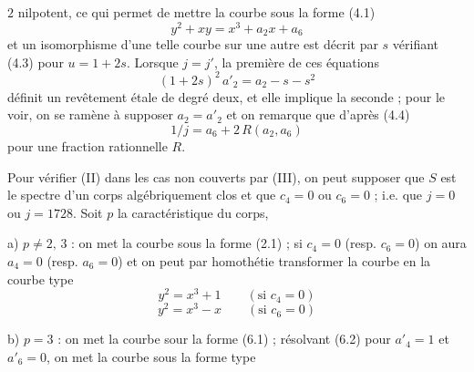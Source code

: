 \makeatletter\tagsleft@true\makeatother

$2$ nilpotent, ce qui permet de mettre la courbe sous la forme (4.1)
\[
y^2+xy=x^3+a_2x+a_6
\]
et un isomorphisme d'une telle courbe sur une autre est décrit par $s$ vérifiant (4.3) pour $u=1+2s$. Lorsque $j=j'$, la première de ces équations
\[
(1+2s)^2\,a'_2=a_2-s-s^2
\]
définit un revêtement étale de degré deux, et elle implique la seconde ; pour le voir, on se ramène à supposer $a_2=a'_2$ et on remarque que d'après (4.4)
\[
1/j=a_6+2\,R(a_2,a_6)
\]
pour une fraction rationnelle $R$.

Pour vérifier (II) dans les cas non couverts par (III), on peut supposer que $S$ est le spectre d'un corps algébriquement clos et que $c_4=0$ ou $c_6=0$ ; i.e. que $j=0$ ou $j=1728$. Soit $p$ la caractéristique du corps,

a) $p\ne 2,\,3$ : on met la courbe sous la forme (2.1) ; si $c_4=0$ (resp. $c_6=0$) on aura $a_4=0$ (resp. $a_6=0$) et on peut par homothétie transformer la courbe en la courbe type
\[
y^2=x^3+1\qquad(\text{si }c_4=0)\tag*{(6.5)}
\]
\[
y^2=x^3-x\qquad(\text{si }c_6=0)\tag*{(6.6)}
\]

b) $p=3$ : on met la courbe sour la forme (6.1) ; résolvant (6.2) pour $a'_4=1$ et $a'_6=0$, on met la courbe sous la forme type

